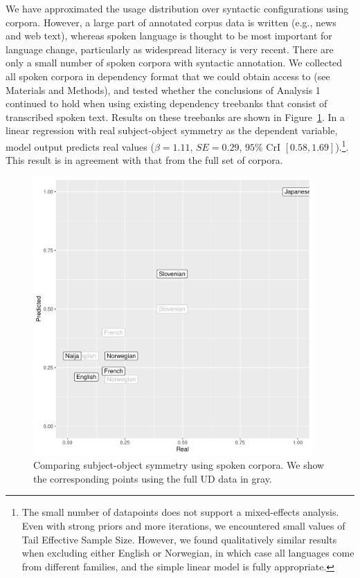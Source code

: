 \documentclass[11pt,a4paper]{article}
\newcommand\mhahn[1]{{\color{red}(#1)}}
\begin{document}
We have approximated the usage distribution over syntactic configurations using corpora.
However, a large part of annotated corpus data is written (e.g., news and web text), whereas spoken language is thought to be most important for language change, particularly as widespread literacy is very recent.
There are only a small number of spoken corpora with syntactic annotation.
We collected all spoken corpora in dependency format that we could obtain access to (see Materials and Methods), and tested whether the conclusions of Analysis 1 continued to hold when using existing dependency treebanks that consist of transcribed spoken text.
Results on these treebanks are shown in Figure~\ref{fig:spoken}.
In a linear regression with real subject-object symmetry as the dependent variable, model output predicts real values ($\beta=1.11$, $SE=0.29$, $95\%$ CrI $[0.58, 1.69]$).\footnote{The small number of datapoints does not support a mixed-effects analysis. Even with strong priors and more iterations, we encountered small values of Tail Effective Sample Size. However, we found qualitatively similar results when excluding either English or Norwegian, in which case all languages come from different families, and the simple linear model is fully appropriate.}.
This result is in agreement with that from the full set of corpora.

\begin{figure}
    \centering
    \includegraphics[width=0.95\textwidth]{analysis_spoken/spoken.pdf}
    \caption{Comparing subject-object symmetry using spoken corpora. We show the corresponding points using the full UD data in gray.}
    \label{fig:spoken}
\end{figure}
\end{document}
